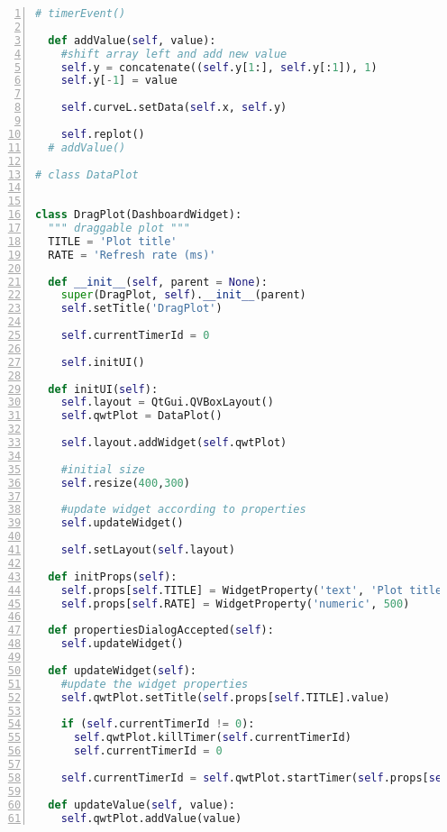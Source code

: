 \begin{lstlisting}[frame=single,caption={DragPlot implementation.},label=drag_plot_implementation,language=Python,numbers=left,breaklines=true]
  # timerEvent()

  def addValue(self, value):
    #shift array left and add new value
    self.y = concatenate((self.y[1:], self.y[:1]), 1)
    self.y[-1] = value

    self.curveL.setData(self.x, self.y)

    self.replot()
  # addValue()

# class DataPlot


class DragPlot(DashboardWidget):
  """ draggable plot """
  TITLE = 'Plot title'
  RATE = 'Refresh rate (ms)'
  
  def __init__(self, parent = None):
    super(DragPlot, self).__init__(parent)
    self.setTitle('DragPlot')
    
    self.currentTimerId = 0
    
    self.initUI()
      
  def initUI(self):
    self.layout = QtGui.QVBoxLayout()
    self.qwtPlot = DataPlot()
    
    self.layout.addWidget(self.qwtPlot)
    
    #initial size
    self.resize(400,300)
    
    #update widget according to properties
    self.updateWidget()
    
    self.setLayout(self.layout)
      
  def initProps(self):
    self.props[self.TITLE] = WidgetProperty('text', 'Plot title')
    self.props[self.RATE] = WidgetProperty('numeric', 500)
  
  def propertiesDialogAccepted(self):
    self.updateWidget()

  def updateWidget(self):
    #update the widget properties
    self.qwtPlot.setTitle(self.props[self.TITLE].value)

    if (self.currentTimerId != 0):
      self.qwtPlot.killTimer(self.currentTimerId)
      self.currentTimerId = 0

    self.currentTimerId = self.qwtPlot.startTimer(self.props[self.RATE].value)
      
  def updateValue(self, value):
    self.qwtPlot.addValue(value)
\end{lstlisting}


